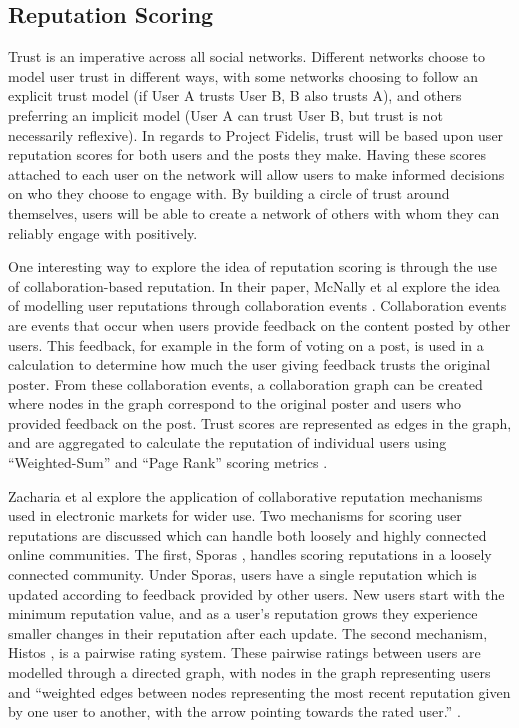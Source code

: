 \subsection{Reputation Scoring}
Trust is an imperative across all social networks. Different networks choose to model user trust in different ways, with some networks choosing to follow an explicit trust model (if User A trusts User B, B also trusts A), and others preferring an implicit model (User A can trust User B, but trust is not necessarily reflexive). In regards to Project Fidelis, trust will be based upon user reputation scores for both users and the posts they make. Having these scores attached to each user on the network will allow users to make informed decisions on who they choose to engage with. By building a circle of trust around themselves, users will be able to create a network of others with whom they can reliably engage with positively.

One interesting way to explore the idea of reputation scoring is through the use of collaboration-based reputation. In their paper, McNally et al explore the idea of modelling user reputations through collaboration events \cite{mcnally2013}. Collaboration events are events that occur when users provide feedback on the content posted by other users. This feedback, for example in the form of voting on a post, is used in a calculation to determine how much the user giving feedback trusts the original poster. From these collaboration events, a collaboration graph can be created where nodes in the graph correspond to the original poster and users who provided feedback on the post. Trust scores are represented as edges in the graph, and are aggregated to calculate the reputation of individual users using ``Weighted-Sum'' and ``Page Rank'' scoring metrics \cite{mcnally2013}.

Zacharia et al explore the application of collaborative reputation mechanisms used in electronic markets for wider use. Two mechanisms for scoring user reputations are discussed which can handle both loosely and highly connected online communities. The first, Sporas \cite{zacharia2000}, handles scoring reputations in a loosely connected community. Under Sporas, users have a single reputation which is updated according to feedback provided by other users. New users start with the minimum reputation value, and as a user’s reputation grows they experience smaller changes in their reputation after each update. The second mechanism, Histos \cite{zacharia2000}, is a pairwise rating system. These pairwise ratings between users are modelled through a directed graph, with nodes in the graph representing users and ``weighted edges between nodes representing the most recent reputation given by one user to another, with the arrow pointing towards the rated user.'' \cite{zacharia2000}.

